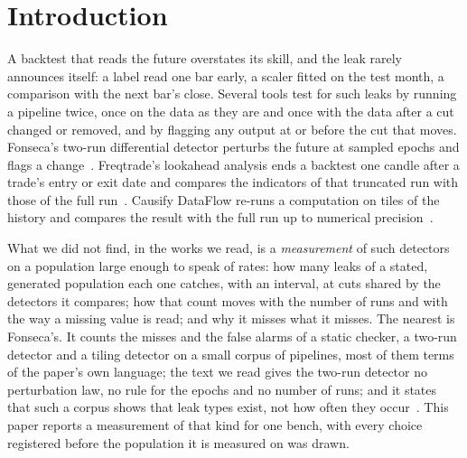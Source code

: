 \documentclass[11pt]{article}
\begin{document}
\section{Introduction}\label{sec:intro}

A backtest that reads the future overstates its skill, and the leak rarely announces itself: a
label read one bar early, a scaler fitted on the test month, a comparison with the next bar's
close. Several tools test for such leaks by running a pipeline twice, once on the data as they
are and once with the data after a cut changed or removed, and by flagging any output at or
before the cut that moves. Fonseca's two-run differential detector perturbs the future at sampled
epochs and flags a change~\cite{fonseca2026}. %
Freqtrade's lookahead analysis ends a backtest one candle after a trade's entry or exit date and compares the indicators
of that truncated run with those of the full run~\cite{freqtrade}. %
Causify DataFlow re-runs a computation on tiles of the history and compares the result with the
full run up to numerical precision~\cite{causify2025}. %

What we did not find, in the works we read, is a \emph{measurement} of such detectors on a
population large enough to speak of rates: how many leaks of a stated, generated population each
one catches, with an interval, at cuts shared by the detectors it compares; how that count moves with the
number of runs and with the way a missing value is read; and why it misses what it misses. The
nearest is Fonseca's. It counts the misses and the false alarms of a static checker, a two-run
detector and a tiling detector on a small corpus of pipelines, most of them terms of the paper's
own language; the text we read gives the two-run detector no perturbation law, no rule for the
epochs and no number of runs; and it states that such a corpus shows that leak types exist, not
how often they occur~\cite{fonseca2026}. %
This paper reports a measurement of that kind for one bench, with every choice registered before
the population it is measured on was drawn.
\end{document}
